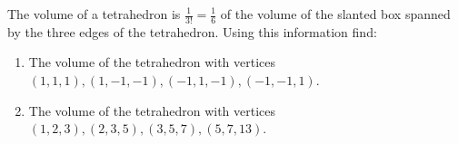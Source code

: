 The volume of a tetrahedron is $\frac{1}{3!}=\frac{1}{6}$ of the volume of the slanted box spanned by the three edges of the tetrahedron. Using this information find:

\begin{enumerate}
\item The volume of the tetrahedron with vertices $(1,1,1), (1,-1,-1), (-1,1,-1), (-1,-1,1)$.
\item The volume of the tetrahedron with vertices $(1,2,3), (2,3,5), (3,5,7), (5,7,13)$.
\end{enumerate}